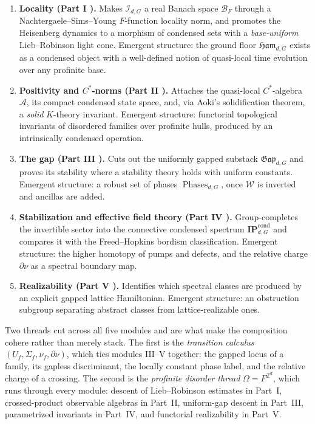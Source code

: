 \documentclass[12pt]{article}
\newcommand{\Int}{\mathcal{I}}                 %
\newcommand{\Ffun}{F}                          %
\newcommand{\BF}{\mathcal{B}_{F}}              %
\newcommand{\Ham}{\mathfrak{Ham}}              %
\newcommand{\Gap}{\mathfrak{Gap}}              %
\newcommand{\Phases}{\operatorname{Phases}}    %
\newcommand{\Weq}{\mathcal{W}}                 %
\newcommand{\IPcond}{\mathbf{IP}^{\mathrm{cond}}}  %
\newcommand{\Sig}{\Sigma}                       %
\newcommand{\rc}{\partial\nu}                   %
\newcommand{\dis}{\Omega}                       %
\newcommand{\ZZ}{\mathbb{Z}}
\newcommand{\qA}{\mathcal{A}}                  %
\theoremstyle{plain}
\theoremstyle{definition}
\theoremstyle{remark}
\begin{document}
\begin{enumerate}
\item \textbf{Locality (Part I \cite{paperLocality}).} Makes $\Int_{d,G}$ a real Banach
  space $\BF$ through a Nachtergaele--Sims--Young $\Ffun$-function locality norm, and
  promotes the Heisenberg dynamics to a morphism of condensed sets with a
  \emph{base-uniform} Lieb--Robinson light cone. Emergent structure: the ground floor
  $\Ham_{d,G}$ exists as a condensed object with a well-defined notion of quasi-local
  time evolution over any profinite base.
\item \textbf{Positivity and $C^\ast$-norms (Part II \cite{paperPositivity}).} Attaches
  the quasi-local $C^\ast$-algebra $\qA$, its compact condensed state space, and, via
  Aoki's solidification theorem, a \emph{solid} $K$-theory invariant. Emergent
  structure: functorial topological invariants of disordered families over profinite
  hulls, produced by an intrinsically condensed operation.
\item \textbf{The gap (Part III \cite{paperGap}).} Cuts out the uniformly gapped
  substack $\Gap_{d,G}$ and proves its stability where a stability theory holds with
  uniform constants. Emergent structure: a robust set of phases $\Phases_{d,G}$, once
  $\Weq$ is inverted and ancillas are added.
\item \textbf{Stabilization and effective field theory (Part IV \cite{paperEFT}).}
  Group-completes the invertible sector into the connective condensed spectrum
  $\IPcond_{d,G}$ and compares it with the Freed--Hopkins bordism classification.
  Emergent structure: the higher homotopy of pumps and defects, and the relative charge
  $\rc$ as a spectral boundary map.
\item \textbf{Realizability (Part V \cite{paperRealizability}).} Identifies which
  spectral classes are produced by an explicit gapped lattice Hamiltonian. Emergent
  structure: an obstruction subgroup separating abstract classes from lattice-realizable
  ones.
\end{enumerate}

Two threads cut across all five modules and are what make the composition cohere rather
than merely stack. The first is the \emph{transition calculus}
$(U_f,\Sig_f,\nu_f,\rc)$, which ties modules III--V together: the gapped locus of a
family, its gapless discriminant, the locally constant phase label, and the relative
charge of a crossing. The second is the \emph{profinite disorder thread}
$\dis=\Ffun^{\ZZ^d}$, which runs through every module: descent of Lieb--Robinson
estimates in Part~I, crossed-product observable algebras in Part~II, uniform-gap descent
in Part~III, parametrized invariants in Part~IV, and functorial realizability in
Part~V\@.
\end{document}
